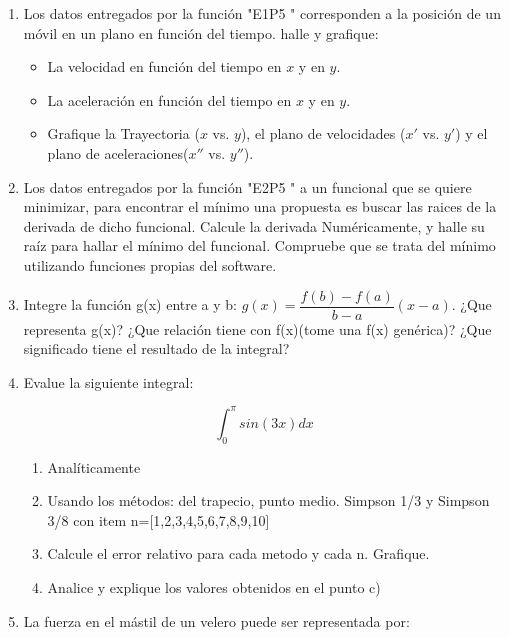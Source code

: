 \documentclass[a4paper,11pt]{article}
\theoremstyle{mytheor}
\begin{document}
\begin{enumerate}
    \item Los datos entregados por la función "E1P5 " corresponden a la posición de un móvil en un plano en función del tiempo. halle y grafique:
    \begin{itemize}
    	\item La velocidad en función del tiempo en $x$ y en $y$.
    	\item La aceleración en función del tiempo en $x$ y en $y$.
    	\item Grafique la Trayectoria ($x$ vs. $y$), el plano de velocidades ($x'$ vs. $y'$) y el 					plano de aceleraciones($x''$ vs. $y''$).
    \end{itemize}
    
    
    \item Los datos entregados por la función "E2P5 " a un funcional que se quiere minimizar, para encontrar el mínimo una propuesta es buscar las raices de la derivada de dicho funcional. Calcule la derivada Numéricamente, y halle su raíz para hallar el mínimo del funcional. Compruebe que se trata del mínimo utilizando funciones propias del software.


	\item Integre la función g(x) entre a y b: $g(x)=\dfrac{f(b)-f(a)}{b-a}(x-a)$. ¿Que representa g(x)? ¿Que relación tiene con f(x)(tome una f(x) genérica)? ¿Que significado tiene el resultado de la integral?

	\item Evalue la siguiente integral:

\begin{equation*}
    \int_{0}^{\pi}sin(3x)dx
\end{equation*}

\begin{enumerate}[label=\alph*)]
    \item Analíticamente
    \item Usando los métodos: del trapecio, punto medio. Simpson 1/3 y Simpson 3/8 con item n=[1,2,3,4,5,6,7,8,9,10]
    \item Calcule el error relativo para cada metodo y cada n. Grafique.
    \item Analice y explique los valores obtenidos en el punto c)
\end{enumerate} 




\item La fuerza en el mástil de un velero puede ser representada por:


\end{enumerate}
\end{document}
